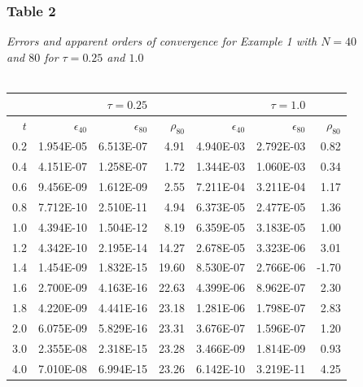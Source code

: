 \documentclass[letterpaper, 12pt]{article}
\begin{document}
	\subsubsection*{Table 2} \small\textit{Errors and apparent orders of convergence for Example 1 with $N=40$\\ and $80$ for $\tau=0.25$ and $1.0$} \\\\
	\normalsize
	\begin{tabular}{r||rrr|rrr}
			     &             &$\tau = 0.25$		  &	 	  	 &             &$\tau = 1.0$    	&		  \\
		\hline
		$t$  &$\epsilon_{40}$  &$\epsilon_{80}$  &$\rho_{80}$  &$\epsilon_{40}$  &$\epsilon_{80}$  &$\rho_{80}$ \\ 
		\hline
		0.2    &1.954E-05    &6.513E-07         &4.91    &4.940E-03    &2.792E-03         &0.82 \\ 
		0.4    &4.151E-07    &1.258E-07         &1.72    &1.344E-03    &1.060E-03         &0.34 \\ 
		0.6    &9.456E-09    &1.612E-09         &2.55    &7.211E-04    &3.211E-04         &1.17 \\ 
		0.8    &7.712E-10    &2.510E-11         &4.94    &6.373E-05    &2.477E-05         &1.36 \\ 
		1.0    &4.394E-10    &1.504E-12         &8.19    &6.359E-05    &3.183E-05         &1.00 \\ 
		1.2    &4.342E-10    &2.195E-14        &14.27    &2.678E-05    &3.323E-06         &3.01 \\ 
		1.4    &1.454E-09    &1.832E-15        &19.60    &8.530E-07    &2.766E-06        &-1.70 \\ 
		1.6    &2.700E-09    &4.163E-16        &22.63    &4.399E-06    &8.962E-07         &2.30 \\ 
		1.8    &4.220E-09    &4.441E-16        &23.18    &1.281E-06    &1.798E-07         &2.83 \\ 
		2.0    &6.075E-09    &5.829E-16        &23.31    &3.676E-07    &1.596E-07         &1.20 \\ 
		3.0    &2.355E-08    &2.318E-15        &23.28    &3.466E-09    &1.814E-09         &0.93 \\ 
		4.0    &7.010E-08    &6.994E-15        &23.26    &6.142E-10    &3.219E-11         &4.25 \\ 
		\hline
	\end{tabular}
	
\end{document}
